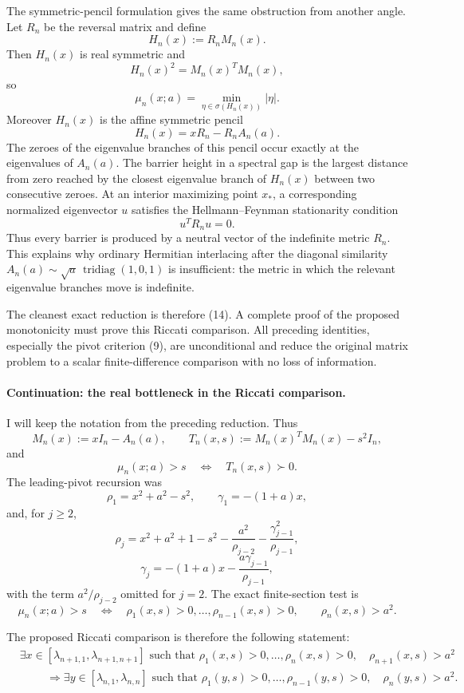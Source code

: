 \documentclass[11pt]{article}
\begin{document}
The symmetric-pencil formulation gives the same obstruction from another angle.
Let \(R_n\) be the reversal matrix and define
\[
H_n(x):=R_nM_n(x).
\]
Then \(H_n(x)\) is real symmetric and
\[
H_n(x)^2=M_n(x)^TM_n(x),
\]
so
\[
\mu_n(x;a)=\min_{\eta\in\sigma(H_n(x))}|\eta|.
\tag{17}
\]
Moreover \(H_n(x)\) is the affine symmetric pencil
\[
H_n(x)=xR_n-R_nA_n(a).
\tag{18}
\]
The zeroes of the eigenvalue branches of this pencil occur exactly at the eigenvalues of
\(A_n(a)\).  The barrier height in a spectral gap is the largest distance from zero reached
by the closest eigenvalue branch of \(H_n(x)\) between two consecutive zeroes.  At an
interior maximizing point \(x_*\), a corresponding normalized eigenvector \(u\) satisfies
the Hellmann--Feynman stationarity condition
\[
u^TR_nu=0.
\tag{19}
\]
Thus every barrier is produced by a neutral vector of the indefinite metric \(R_n\).
This explains why ordinary Hermitian interlacing after the diagonal similarity
\(A_n(a)\sim \sqrt a\,\operatorname{tridiag}(1,0,1)\) is insufficient: the metric in
which the relevant eigenvalue branches move is indefinite.

The cleanest exact reduction is therefore (14).  A complete proof of the proposed
monotonicity must prove this Riccati comparison.  All preceding identities,
especially the pivot criterion (9), are unconditional and reduce the original matrix
problem to a scalar finite-difference comparison with no loss of information.

\paragraph{Continuation: the real bottleneck in the Riccati comparison.}

I will keep the notation from the preceding reduction.  Thus
\[
M_n(x):=xI_n-A_n(a),\qquad
T_n(x,s):=M_n(x)^TM_n(x)-s^2I_n,
\]
and
\[
\mu_n(x;a)>s
\quad\Longleftrightarrow\quad
T_n(x,s)\succ0.
\tag{1}
\]
The leading-pivot recursion was
\[
\rho_1=x^2+a^2-s^2,\qquad \gamma_1=-(1+a)x,
\tag{2}
\]
and, for \(j\ge2\),
\[
\rho_j
=
x^2+a^2+1-s^2
-\frac{a^2}{\rho_{j-2}}
-\frac{\gamma_{j-1}^2}{\rho_{j-1}},
\tag{3}
\]
\[
\gamma_j
=
-(1+a)x-\frac{a\gamma_{j-1}}{\rho_{j-1}},
\tag{4}
\]
with the term \(a^2/\rho_{j-2}\) omitted for \(j=2\).  The exact finite-section test is
\[
\mu_n(x;a)>s
\quad\Longleftrightarrow\quad
\rho_1(x,s)>0,\dots,\rho_{n-1}(x,s)>0,\qquad
\rho_n(x,s)>a^2.
\tag{5}
\]

The proposed Riccati comparison is therefore the following statement:
\[
\begin{aligned}
&\exists x\in[\lambda_{n+1,1},\lambda_{n+1,n+1}]
\text{ such that }
\rho_1(x,s)>0,\dots,\rho_n(x,s)>0,\quad \rho_{n+1}(x,s)>a^2
\\
&\hspace{1cm}\Longrightarrow
\exists y\in[\lambda_{n,1},\lambda_{n,n}]
\text{ such that }
\rho_1(y,s)>0,\dots,\rho_{n-1}(y,s)>0,\quad \rho_n(y,s)>a^2.
\end{aligned}
\tag{6}
\]
\end{document}
